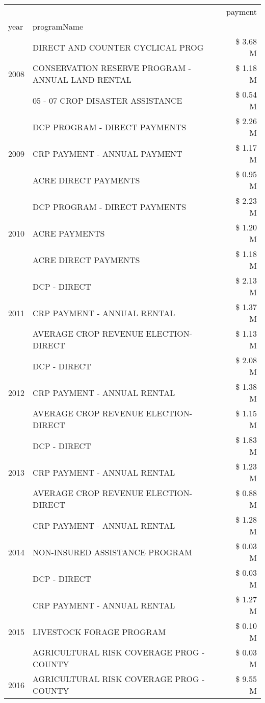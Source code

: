 \begin{tabular}{llr}
\toprule
 &  & payment \\
year & programName &  \\
\midrule
\multirow[t]{3}{*}{2008} & DIRECT AND COUNTER CYCLICAL PROG & \$ 3.68 M \\
 & CONSERVATION RESERVE PROGRAM - ANNUAL LAND RENTAL & \$ 1.18 M \\
 & 05 - 07 CROP DISASTER ASSISTANCE & \$ 0.54 M \\
\cline{1-3}
\multirow[t]{3}{*}{2009} & DCP PROGRAM - DIRECT PAYMENTS & \$ 2.26 M \\
 & CRP PAYMENT - ANNUAL PAYMENT & \$ 1.17 M \\
 & ACRE DIRECT PAYMENTS & \$ 0.95 M \\
\cline{1-3}
\multirow[t]{3}{*}{2010} & DCP PROGRAM - DIRECT PAYMENTS & \$ 2.23 M \\
 & ACRE PAYMENTS & \$ 1.20 M \\
 & ACRE DIRECT PAYMENTS & \$ 1.18 M \\
\cline{1-3}
\multirow[t]{3}{*}{2011} & DCP - DIRECT & \$ 2.13 M \\
 & CRP PAYMENT - ANNUAL RENTAL & \$ 1.37 M \\
 & AVERAGE CROP REVENUE ELECTION-DIRECT & \$ 1.13 M \\
\cline{1-3}
\multirow[t]{3}{*}{2012} & DCP - DIRECT & \$ 2.08 M \\
 & CRP PAYMENT - ANNUAL RENTAL & \$ 1.38 M \\
 & AVERAGE CROP REVENUE ELECTION-DIRECT & \$ 1.15 M \\
\cline{1-3}
\multirow[t]{3}{*}{2013} & DCP - DIRECT & \$ 1.83 M \\
 & CRP PAYMENT - ANNUAL RENTAL & \$ 1.23 M \\
 & AVERAGE CROP REVENUE ELECTION-DIRECT & \$ 0.88 M \\
\cline{1-3}
\multirow[t]{3}{*}{2014} & CRP PAYMENT - ANNUAL RENTAL & \$ 1.28 M \\
 & NON-INSURED ASSISTANCE PROGRAM & \$ 0.03 M \\
 & DCP - DIRECT & \$ 0.03 M \\
\cline{1-3}
\multirow[t]{3}{*}{2015} & CRP PAYMENT - ANNUAL RENTAL & \$ 1.27 M \\
 & LIVESTOCK FORAGE PROGRAM & \$ 0.10 M \\
 & AGRICULTURAL RISK COVERAGE PROG - COUNTY & \$ 0.03 M \\
\cline{1-3}
\multirow[t]{3}{*}{2016} & AGRICULTURAL RISK COVERAGE PROG - COUNTY      & \$ 9.55 M \\

\end{tabular}
